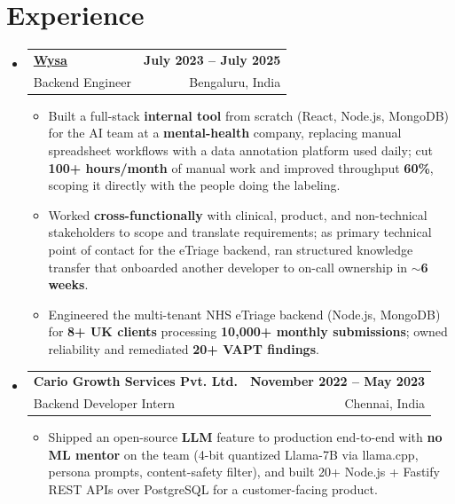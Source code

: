 \documentclass[letterpaper,10pt]{article}
\makeatletter
\newcommand{\resumeItem}[1]{
  \item\small{#1\vspace{-1pt}}
}
\newcommand{\resumeSubheading}[4]{
  \vspace{1pt}\item
    \begin{tabular*}{0.985\textwidth}[t]{l@{\extracolsep{\fill}}r}
      \textbf{#1} & \textbf{\small #2} \\
      {\small\color{ResumeSlate} #3} & {\small\color{ResumeSlate} #4} \\
    \end{tabular*}\vspace{-6pt}
}
\newcommand{\resumeSubHeadingListStart}{\begin{itemize}[leftmargin=0.0in, label={}, itemsep=2pt, topsep=2pt]}
\newcommand{\resumeSubHeadingListEnd}{\end{itemize}}
\newcommand{\resumeItemListStart}{\begin{itemize}[leftmargin=0.18in, itemsep=2pt, topsep=1pt]}
\newcommand{\resumeItemListEnd}{\end{itemize}\vspace{-4pt}}
\makeatother
\begin{document}
\section{Experience}
\resumeSubHeadingListStart
  \resumeSubheading
    {\href{https://www.wysa.io}{Wysa}}{July 2023 -- July 2025}
    {Backend Engineer}{Bengaluru, India}
    \resumeItemListStart
      \resumeItem{Built a full-stack \textbf{internal tool} from scratch (React, Node.js, MongoDB) for the AI team at a \textbf{mental-health} company, replacing manual spreadsheet workflows with a data annotation platform used daily; cut \textbf{100+ hours/month} of manual work and improved throughput \textbf{60\%}, scoping it directly with the people doing the labeling.}
      \resumeItem{Worked \textbf{cross-functionally} with clinical, product, and non-technical stakeholders to scope and translate requirements; as primary technical point of contact for the eTriage backend, ran structured knowledge transfer that onboarded another developer to on-call ownership in \textbf{$\sim$6 weeks}.}
      \resumeItem{Engineered the multi-tenant NHS eTriage backend (Node.js, MongoDB) for \textbf{8+ UK clients} processing \textbf{10{,}000+ monthly submissions}; owned reliability and remediated \textbf{20+ VAPT findings}.}
    \resumeItemListEnd
  \resumeSubheading
    {Cario Growth Services Pvt. Ltd.}{November 2022 -- May 2023}
    {Backend Developer Intern}{Chennai, India}
    \resumeItemListStart
      \resumeItem{Shipped an open-source \textbf{LLM} feature to production end-to-end with \textbf{no ML mentor} on the team (4-bit quantized Llama-7B via llama.cpp, persona prompts, content-safety filter), and built 20+ Node.js + Fastify REST APIs over PostgreSQL for a customer-facing product.}
    \resumeItemListEnd
\resumeSubHeadingListEnd
\vspace{-4pt}
\end{document}

